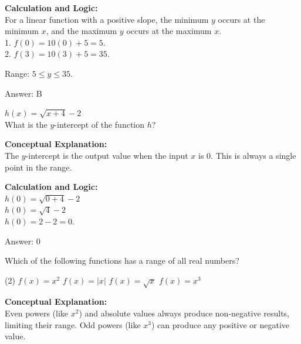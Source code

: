 \documentclass[11pt,paper=a4,answers]{exam}
\begin{document}
\begin{questions}
\begin{solution}
\textbf{Calculation and Logic:} \\
For a linear function with a positive slope, the minimum $y$ occurs at the minimum $x$, and the maximum $y$ occurs at the maximum $x$. \\
1. $f(0) = 10(0) + 5 = 5$. \\
2. $f(3) = 10(3) + 5 = 35$.

\vspace{15pt}

Range: $5 \leq y \leq 35$.

\vspace{30pt}

Answer: \colorbox{yellow!100}{B}
\end{solution}

\vspace{40pt}

\question
$h(x) = \sqrt{x+4} - 2$ \\
What is the $y$-intercept of the function $h$?

\begin{solution}
\textbf{Conceptual Explanation:} \\
The $y$-intercept is the output value when the input $x$ is 0. This is always a single point in the range.

\vspace{30pt}

\textbf{Calculation and Logic:} \\
$h(0) = \sqrt{0 + 4} - 2$ \\
$h(0) = \sqrt{4} - 2$ \\
$h(0) = 2 - 2 = 0$.

\vspace{30pt}

Answer: \colorbox{yellow!100}{0}
\end{solution}

\vspace{40pt}

\question
Which of the following functions has a range of all real numbers?
\begin{tasks}(2)
    \task $f(x) = x^2$
    \task $f(x) = |x|$
    \task $f(x) = \sqrt{x}$
    \task $f(x) = x^3$
\end{tasks}

\begin{solution}
\textbf{Conceptual Explanation:} \\
Even powers (like $x^2$) and absolute values always produce non-negative results, limiting their range. Odd powers (like $x^3$) can produce any positive or negative value.


\end{solution}
\end{questions}
\end{document}
